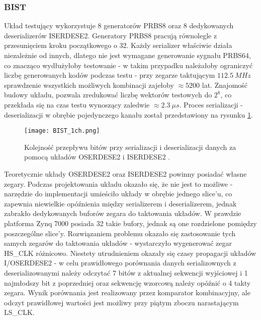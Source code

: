         \subsubsection{BIST}
            Układ testujący wykorzystuje 8 generatorów PRBS8 \cite{PRBS8_Thesis} oraz 8 dedykowanych deserializerów ISERDESE2. 
            Generatory PRBS8 pracują równolegle z przesunięciem kroku początkowego o 32. Każdy serializer właściwie działa niezależnie 
            od innych, dlatego nie jest wymagane generowanie sygnału PRBS64, co znacząco wydłużyłoby testowanie - w takim przypadku 
            należałoby ograniczyć liczbę generowanych kodów podczas testu - przy zegarze taktującym $112.5 \ MHz$ sprawdzenie wszystkich 
            możliwych kombinacji zajełoby $\approx 5200$ lat. Znajomość budowy układu, pozwala zredukować liczbę wektorów testowych
            do $2^8$, co przekłada się na czas testu wynoszący zaledwie $\approx 2.3 \ \mu s$. 
            Proces serializacji - deserializacji w obrębie pojedynczego kanału został przedstawiony na rysunku \ref{fig:IOSERDES}. 
            \begin{figure}[!ht]
                \centering
                \texttt{[image: BIST\_1ch.png]}
                \caption{Kolejność przepływu bitów przy serializacji i deserializacji danych za pomocą układów OSERDESE2 i ISERDESE2 \cite{FPGA_SelectIO}.}
                \label{fig:IOSERDES}
            \end{figure}
            Teoretycznie układy OSERDESE2 oraz ISERDESE2 powinny posiadać własne zegary. Podczas projektowania układu okazało się, że 
            nie jest to możliwe - narzędzie do implementacji umieściło układy w obrębie jednego slice'u, co zapewnia niewielkie 
            opóźnienia między serializerem i deserializerem, jednak zabrakło dedykowanych buforów zegara do taktowania układów. 
            W prawdzie platforma Zynq 7000 posiada 32 takie bufory, jednak są one rozdzielone pomiędzy poszczególne slice'y. 
            Rozwiązaniem problemu okazało się zastosowanie tych samych zegarów do taktowania układów - wystarczyło wygenerować 
            zegar HS\_CLK różnicowo. Niestety utrudnieniem okazały się czasy propagacji układów I/OSERDESE2 - w celu prawidłowego 
            porównania  danych serializownych z deserializowanymi należy odczytać 7 bitów z aktualnej sekwencji wyjściowej i 1 najmłodszy 
            bit z poprzedniej oraz sekwencję wzorcową należy opóźnić o 4 takty zegara. Wynik porównania jest realizowany przez 
            komparator kombinacyjny, ale odczyt prawidłowej wartości jest możliwy przy piątym zboczu narastającym LS\_CLK. 
